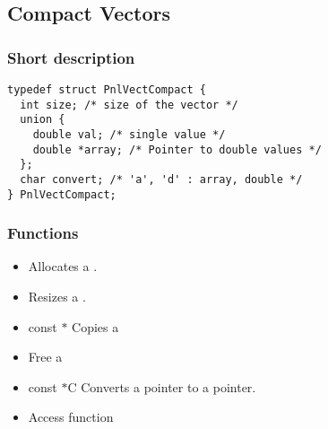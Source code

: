 \subsection{Compact Vectors}
\subsubsection{Short description}

\begin{verbatim}
typedef struct PnlVectCompact {
  int size; /* size of the vector */
  union {
    double val; /* single value */
    double *array; /* Pointer to double values */
  };
  char convert; /* 'a', 'd' : array, double */
} PnlVectCompact;
\end{verbatim}

\subsubsection{Functions}

\begin{itemize}
\item {}
  \sshortdescribe Allocates a .  

\item {} 
  \sshortdescribe Resizes a .  

\item {} {const $\ast$}
  \sshortdescribe Copies a   

\item {}
  \sshortdescribe Free a   

\item {}
  {const  $\ast$C} 
  \sshortdescribe Converts a  pointer to a  pointer.  

\item {}
  \sshortdescribe Access function  
\end{itemize}

